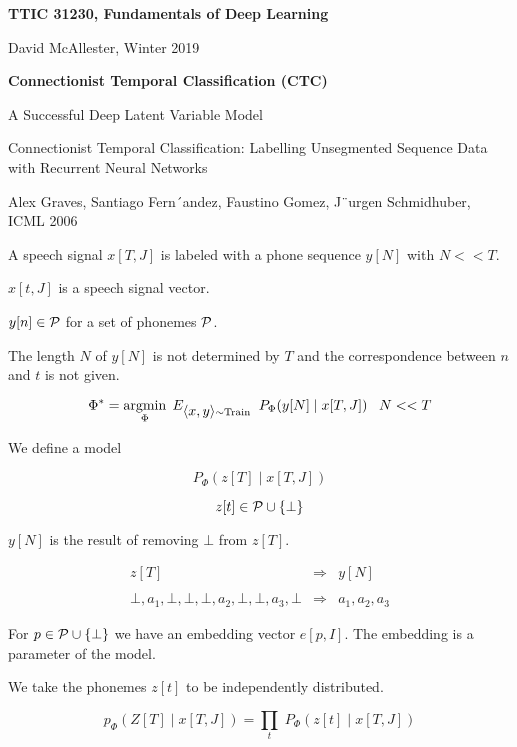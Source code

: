 




{\Huge

  \centerline{\bf TTIC 31230, Fundamentals of Deep Learning}
  \bigskip
  \centerline{David McAllester, Winter 2019}
  \vfill
  \centerline{\bf Connectionist Temporal Classification (CTC)}
\vfill
\vfill
\vfill

{A Successful Deep Latent Variable Model}

Connectionist Temporal Classification: Labelling Unsegmented
Sequence Data with Recurrent Neural Networks

\vfill
Alex Graves, Santiago Fern´andez, Faustino Gomez, J¨urgen Schmidhuber, ICML 2006

A speech signal $x[T,J]$ is labeled with a phone sequence $y[N]$ with $N << T$.

\vfill
$x[t,J]$ is a speech signal vector.

\vfill
$y[n] \in {\cal P}$ for a set of phonemes ${\cal P}$.


\vfill
The length $N$ of $y[N]$ is not determined by $T$ and the correspondence between $n$ and $t$ is not given.

\vfill
{\color{red} $$\Phi^* = \operatorname*{argmin}_\Phi\;E_{{\mbox{$\langle x,y\rangle$}} \sim \mathrm{Train}}\;\;P_\Phi(y[N]\;|\;x[T,J]) \;\;\;N << T$$}




We define a model

$$P_\Phi(z[T]\;|\;x[T,J])$$

$$z[t] \in {\cal P} \cup \{\bot\}$$

\vfill
$y[N]$ is the result of removing $\bot$ from $z[T]$.

\begin{eqnarray*}
z[T] & \Rightarrow & y[N] \\
\\
\bot,a_1,\bot,\bot,\bot,a_2,\bot,\bot,a_3,\bot  & \Rightarrow & a_1,a_2,a_3
\end{eqnarray*}



For $p \in {\cal P} \cup \{\bot\}$ we have an embedding vector $e[p,I]$.  The embedding is a parameter of the model.

\vfill
We take the phonemes $z[t]$ to be independently distributed.

$$p_\Phi(Z[T]\;|\; x[T,J]) = \prod_t \;P_\Phi(z[t]\;|\;x[T,J])$$

}
